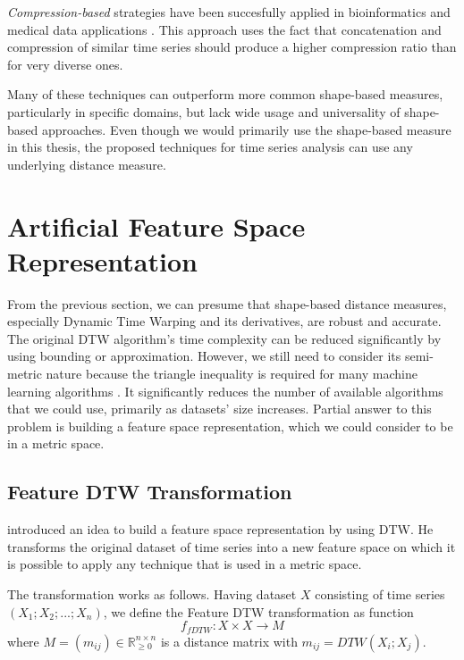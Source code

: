 \textit{Compression-based} strategies have been succesfully applied in bioinformatics and medical data applications \cite{met:cdm, met:cdm-santos, met:cdm-espoti}. This approach uses the fact that concatenation and compression of similar time series should produce a higher compression ratio than for very diverse ones.

Many of these techniques can outperform more common shape-based measures, particularly in specific domains, but lack wide usage and universality of shape-based approaches. Even though we would primarily use the shape-based measure in this thesis, the proposed techniques for time series analysis can use any underlying distance measure.

\section{Artificial Feature Space Representation}
From the previous section, we can presume that shape-based distance measures, especially Dynamic Time Warping and its derivatives, are robust and accurate. The original DTW algorithm's time complexity can be reduced significantly by using bounding or approximation. However, we still need to consider its semi-metric nature because the triangle inequality is required for many machine learning algorithms \cite{cluster:decade-review}. It significantly reduces the number of available algorithms that we could use, primarily as datasets' size increases. Partial answer to this problem is building a feature space representation, which we could consider to be in a metric space.

\subsection{Feature DTW Transformation}
\textcite{met:fDTW} introduced an idea to build a feature space representation by using DTW. He transforms the original dataset of time series into a new feature space on which it is possible to apply any technique that is used in a metric space.

The transformation works as follows. Having dataset $X$ consisting of time series $(X_1; X_2; ...; X_n)$, we define the Feature DTW transformation as function
\begin{equation}
    f_{fDTW}: X \times X \rightarrow M
\end{equation}
where $M=(m_{ij}) \in \mathbb{R}_{\ge 0}^{n \times n}$ is a distance matrix with $m_{ij}=DTW(X_i; X_j)$.
 
